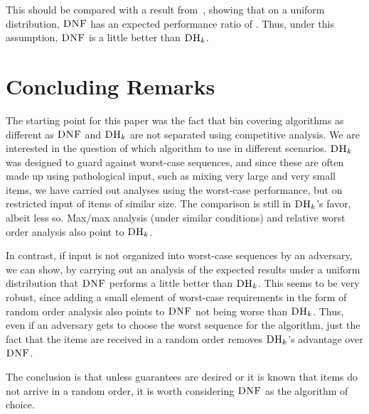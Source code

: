 \documentclass[11pt]{article}
\newcommand{\DNF}{\ensuremath{\operatorname{\textsc{DNF}}}\xspace}
\newcommand{\DHk}{{\ensuremath{\textsc{DH}_k}}\xspace}
\begin{document}
This should be compared with a result from~\cite{CFGK91}, showing
that on a uniform distribution,
\DNF has an expected performance ratio of .
Thus, under this assumption, \DNF is a little better than \DHk.



\section{Concluding Remarks}
The starting point for this paper was the fact that bin covering
algorithms as different as \DNF and \DHk are not separated using
competitive analysis.
We are interested in the question of which algorithm to use in different
scenarios. \DHk was designed to guard against worst-case sequences,
and since these are often made up using pathological input, such as mixing very
large and very small items, we have carried out analyses using the
worst-case performance, but on restricted input of items of similar size.
The comparison is still in \DHk's favor, albeit less so.
Max/max analysis (under similar conditions) and relative worst order
analysis also point to \DHk.

In contrast, if input is not organized into worst-case sequences by
an adversary, we can show, by carrying out an analysis of the expected
results under a uniform distribution that \DNF performs a little
better than \DHk. This seems to be very robust, since adding a small
element of worst-case requirements in the form of random order analysis
also points to \DNF not being worse than \DHk. Thus, even if an adversary
gets to choose the worst sequence for the algorithm, just the fact that
the items are received in a random order removes
\DHk's advantage over \DNF.

The conclusion is that unless guarantees are desired or it is known that
items do not arrive in a random order, it is worth considering \DNF
as the algorithm of choice.
\end{document}
